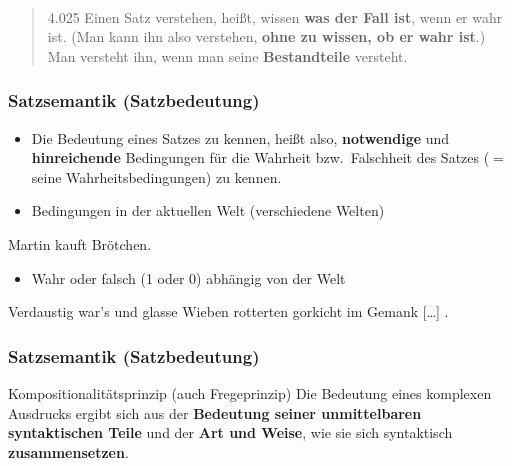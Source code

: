 \begin{frame}
\begin{minipage}{.3\textwidth}
\end{minipage}
~
\begin{minipage}{.65\textwidth}
	
	\begin{quote}
		4.025 Einen Satz verstehen, heißt, wissen \textbf{was der Fall ist}, wenn er wahr ist. (Man kann ihn also verstehen, \textbf{ohne zu wissen, ob er wahr ist}.) Man versteht ihn, wenn man seine \textbf{Bestandteile} versteht. 
	\end{quote}
	\hfill \citep{Wittgenstein72a}
	
\end{minipage}

\end{frame}



\begin{frame}
\frametitle{Satzsemantik (Satzbedeutung)}

\begin{itemize}
	\item Die Bedeutung eines Satzes zu kennen, heißt also, \textbf{notwendige} und \textbf{hinreichende} Bedingungen für die Wahrheit bzw.\ Falschheit des Satzes ($=$ seine Wahrheitsbedingungen) zu kennen.
	\medskip
	\item Bedingungen in der aktuellen Welt (verschiedene Welten)
\end{itemize}

\pause 
	
	\ea Martin kauft Brötchen.
	\z
	
\begin{itemize}	
	\item Wahr oder falsch (1 oder 0) \ras abhängig von der Welt
\end{itemize}

\pause 	
	
	\ea Verdaustig war's und glasse Wieben rotterten gorkicht im Gemank [\dots] \citep{SySt06a}.
	\z 
	


\end{frame}


\begin{frame}
\frametitle{Satzsemantik (Satzbedeutung)}

\begin{block}{Kompositionalitätsprinzip (auch Fregeprinzip)}
Die Bedeutung eines komplexen Ausdrucks ergibt sich aus der \textbf{Bedeutung seiner unmittelbaren syntaktischen Teile} und der \textbf{Art und Weise}, wie sie sich syntaktisch \textbf{zusammensetzen}.
\end{block}

\end{frame}


